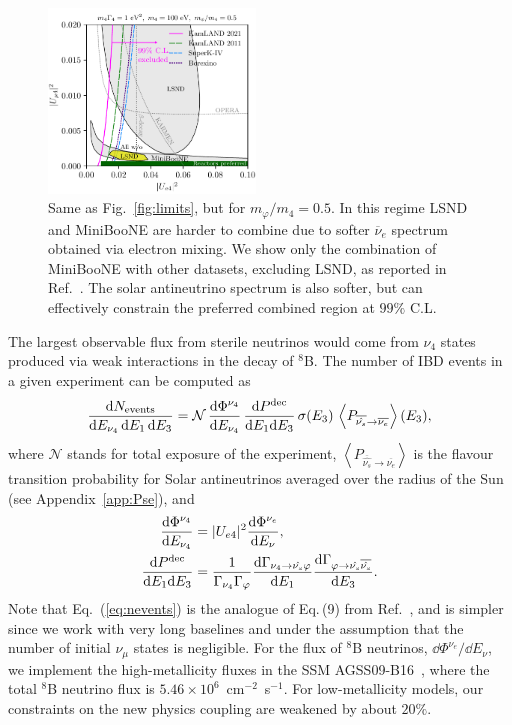 \documentclass[
reprint,
superscriptaddress,
showpacs,
preprintnumbers,
nofootinbib,
nobibnotes,
amsmath,
amssymb, 
aps,
prd,
floatfix
]{revtex4-1}
\newcommand{\refeq}[1]{Eq.~(\ref{#1})}
\newcommand{\reffig}[1]{Fig.~\ref{#1}}
\newcommand{\refapp}[1]{Appendix~\ref{#1}}
\newcommand{\refref}[1]{Ref.~\cite{#1}}
\renewcommand{\phi}{\varphi}
\begin{document}
%
\begin{figure}[t]
    \centering
    \includegraphics[width=0.49\textwidth]{limits_MN_100_MB_50.pdf}
\caption{\label{fig:limits2}Same as \reffig{fig:limits}, but for $m_\phi/m_4 = 0.5$. In this regime LSND and MiniBooNE are harder to combine due to softer $\overline{\nu}_e$ spectrum obtained via electron mixing. We show only the combination of MiniBooNE with other datasets, excluding LSND, as reported in \refref{Dentler:2019dhz}. The solar antineutrino spectrum is also softer, but can effectively constrain the preferred combined region at $99\%$ C.L.}
\end{figure}

The largest observable flux from sterile neutrinos would come from $\nu_4$ states produced via weak interactions in the decay of $^8$B. The number of IBD events in a given experiment can be computed as
%
\begin{align}\label{eq:nevents}
 \frac{\dd N_{\rm events}}{\dd E_{\nu_4} \, \dd E_1 \,\dd E_3} = \mathcal{N} 
 \,\frac{\dd \Phi^{\nu_4}}{\dd E_{\nu_4}}\, \frac{\dd P^{\rm dec} }{\dd E_1 \dd E_3}\,\sigma(E_3) \,\left\langle P_{\overline{\hat{\nu_s}}\to \overline{\nu_e}} \right \rangle(E_3),
\end{align}
%
where $\mathcal{N}$ stands for total exposure of the experiment, $\left\langle P_{\overline{\hat{\nu_s}}\to \overline{\nu_e}} \right \rangle$ is the flavour transition probability for Solar antineutrinos averaged over the radius of the Sun (see \refapp{app:Pse}), and
%
\begin{align}
\frac{\dd \Phi^{\nu_4}}{\dd E_{\nu_4}} & = |U_{e4}|^2 \frac{\dd \Phi^{\nu_e}}{\dd E_\nu},
\\\nonumber
\frac{\dd P^{\rm dec} }{\dd E_1 \dd E_3} & = \frac{1}{\Gamma_{\nu_4} \Gamma_{\phi}} \frac{\dd \Gamma_{\nu_4\to\hat{\nu_s} \phi}}{\dd E_1} \frac{\dd \Gamma_{\phi\to \hat{\nu_s} \overline{\hat{\nu_s}}}}{\dd E_3}.
\end{align}
%
Note that \refeq{eq:nevents} is the analogue of Eq.\,(9) from Ref.~\cite{Dentler:2019dhz}, and is simpler since we work with very long baselines and under the assumption that the number of initial $\nu_\mu$ states is negligible. For the flux of $^8$B neutrinos, $\dd \Phi^{\nu_e}/\dd E_\nu$, we implement the high-metallicity fluxes in the SSM AGSS09-B16~\cite{Vinyoles:2016djt}, where the total $^8$B neutrino flux is $5.46 \times 10^{6}$~cm$^{-2}$~s$^{-1}$. For low-metallicity models, our constraints on the new physics coupling are weakened by about $20\%$.
\end{document}
